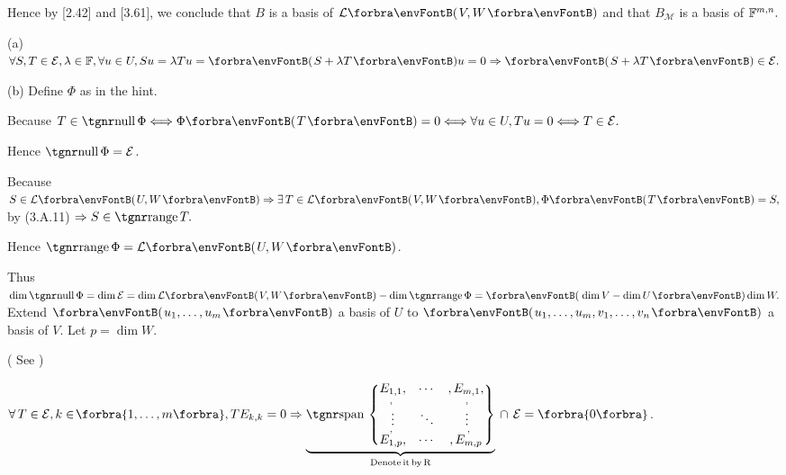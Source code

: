 \documentclass[a4paper, 11pt, UTF8]{article}
\begin{document}
\begin{large}
Hence by [2.42] and [3.61], we conclude that $B$ is a basis of $\Lm{V,W}$ and that $B_{\mathcal{M}}$ is a basis of ${\mathbb{F}}^{m,n}.$\par
\SepLine

\par\quad
(a) \,$\forall S,T\in\mathcal{E},\lambda\in\Fbb,\forall u\in U,Su=\lambda Tu=\Par{S+\lambda T}u=0\Rightarrow\Par{S+\lambda T}\in\mathcal{E}.$\par\quad
(b) Define $\Phi$ as in the hint.\par\quad\Hb
Because $T\in\null\Phi\Longleftrightarrow\Phi\Par{T}=0\Longleftrightarrow\forall u\in U,Tu=0\Longleftrightarrow T\in\mathcal{E}.$\par\quad\Hb
Hence $\null\Phi=\mathcal{E}$.\par\quad\Hb
Because $S\in\Lm{U,W}\Rightarrow\exists\,T\in\Lm{V,W},\Phi\Par{T}=S,$ by (3.A.11) $\Rightarrow S\in\range T.$\par\quad\Hb
Hence $\range\Phi=\Lm{U,W}$.\par\quad\Hb
Thus $\dim\null\Phi=\dim\mathcal{E}=\dim\Lm{V,W}-\dim\range\Phi=\Par{\dim V-\dim U}\dim W.$\PfEnd\vspace{10pt}\quad\Hb
\Or Extend $\Par{u_1,\dots,u_m}$ a basis of $U$ to $\Par{u_1,\dots,u_m,v_1,\dots,v_n}$ a basis of $V$. Let $p=\dim W$.\par\quad\Hb
( See \NOTEFOR\;[3.60])\vspace{-12pt}\par\quad\Hb
$\forall \,T\in\mathcal{E},k\in\!\Bra{1,\dots,m},TE_{k,k}=0\Rightarrow{\normalsize\underbrace{\Spn\begin{Bmatrix} \underset{,}{E_{1,1}}, & \cdots & ,\underset{,}{E_{m,1}},\\ \vdots & \ddots & \,\vdots\\ \overset{,}{E_{1,p}}, & \cdots & ,\overset{,}{E_{m,p}}\end{Bmatrix}}_{\text{Denote\,it\,by\,R}}}\,\cap\,\mathcal{E}=\zeroSubs$.\vspace{-12pt}\par\quad\Hb

\end{large}
\end{document}
